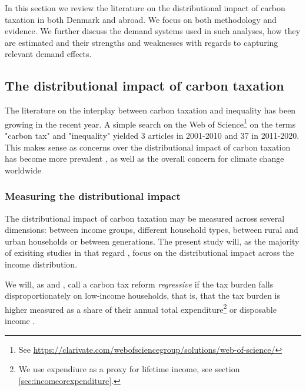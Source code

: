 In this section we review the literature on the distributional impact of carbon taxation in both Denmark and abroad. We focus on both methodology and evidence. We further discuss the demand systems used in such analyses, how they are estimated and their strengths and weaknesses with regards to capturing relevant demand effects.

\subsection{The distributional impact of carbon taxation}

The literature on the interplay between carbon taxation and inequality has been growing in the recent year. A simple search on the Web of Science\footnote{See \hyperlink{https://clarivate.com/webofsciencegroup/solutions/web-of-science/}{https://clarivate.com/webofsciencegroup/solutions/web-of-science/}} on the terms "carbon tax" and "inequality" yielded 3 articles in 2001-2010 and 37 in 2011-2020. This makes sense as concerns over the distributional impact of carbon taxation has become more prevalent \cite{klenert2018making}, as well as the overall concern for climate change worldwide

\subsubsection{Measuring the distributional impact}\label{sec:measuringdistribution}
The distributional impact of carbon taxation may be measured across several dimensions: between income groups, different household types, between rural and urban households or between generations. The present study will, as the majority of exisiting studies in that regard \citep{BARANZINI2000,meta_carbontax}, focus on the distributional impact across the income distribution. 

We will, as \cite{BARANZINI2000} and \cite{Wier2005}, call a carbon tax reform \textit{regressive} if the tax burden falls disproportionately on low-income households, that is, that the tax burden is higher measured as a share of their annual total expenditure\footnote{We use expendiure as a proxy for lifetime income, see section \ref{sec:incomeorexpenditure}.} or disposable income .

